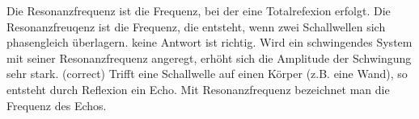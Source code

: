 \documentclass[11pt]{exam}
\begin{document}
\begin{questions}
\begin{choices}
	\choice Die Resonanzfrequenz ist die Frequenz, bei der eine Totalrefexion erfolgt.
	\choice Die Resonanzfreuqenz ist die Frequenz, die entsteht, wenn zwei Schallwellen sich phasengleich überlagern.
	\choice keine Antwort ist richtig.
	\choice Wird ein schwingendes System mit seiner Resonanzfrequenz angeregt, erhöht sich die Amplitude der Schwingung sehr stark. (correct)
	\choice Trifft eine Schallwelle auf einen Körper (z.B. eine Wand), so entsteht durch Reflexion ein Echo. Mit Resonanzfrequenz bezeichnet man die Frequenz des Echos.
\end{choices}

\vspace{3mm}\end{questions}
\end{document}
